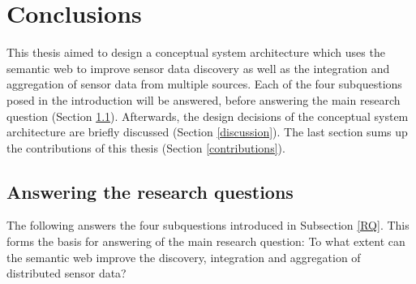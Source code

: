 

\chapter{Conclusions}
\label{chap:conclusion}

This thesis aimed to design a conceptual system architecture which uses the semantic web to improve sensor data discovery as well as the integration and aggregation of sensor data from multiple sources. Each of the four subquestions posed in the introduction will be answered, before answering the main research question (Section \ref{subquestions}). Afterwards, the design decisions of the conceptual system architecture are briefly discussed (Section \ref{discussion}). The last section sums up the contributions of this thesis (Section \ref{contributions}).

\section{Answering the research questions}
\label{subquestions}

The following answers the four subquestions introduced in Subsection \ref{RQ}. This forms the basis for answering of the main research question: To what extent can the semantic web improve the discovery, integration and aggregation of distributed sensor data?

